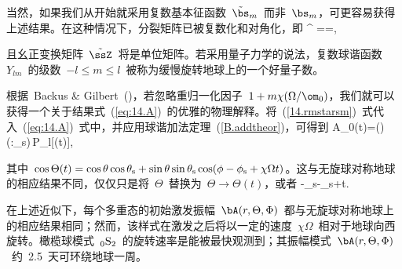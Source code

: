 当然，如果我们从开始就采用复数基本征函数~$\tilde{\bs}_m$~而非~$\bs_m$，可更容易获得上述结果。在这种情况下，分裂矩阵已被复数化和对角化，即
\eq
\tilde{\ssH}^{}
=\tilde{\ssW}=\ssDelta,
\en

且幺正变换矩阵~$\tilde{\ssZ}$~将是单位矩阵。若采用量子力学的说法，复数球谐函数~$Y_{lm}$~的级数~$-l\leq m\leq l$~被称为缓慢旋转地球上的一个好量子数。

根据~Backus \& Gilbert~(\citeyear{backus&gilbert61})，若忽略重归一化因子~$1+m\chi(\Omega/\om_0)$，我们就可以获得一个关于结果式~(\ref{eq:14.A})~的优雅的物理解释。将~(\ref{14.rmstarsm})~式代入~(\ref{eq:14.A})~式中，并应用球谐加法定理~(\ref{B.addtheor})，可得到
\eq
A_0(t)=(\bnuh\cdot\bD)(\bM\!:\!\bE_{\rm s})\,P_l[\cos\Theta(t)],
\en

其中~$\cos\Theta(t)=\cos\theta\cos\theta_{\rm s}
+\sin\theta\sin\theta_{\rm s}\cos(\phi-\phi_{\rm s}+\chi\Omega t)$。这与无旋球对称地球的相应结果不同，仅仅只是将~$\Theta$~替换为~$\Theta\rightarrow\Theta(t)$，或者
\eq
\phi-\phi_{\rm s}\rightarrow\phi-\phi_{\rm s}+\chi\Omega t.
\en

在上述近似下，每个多重态的初始激发振幅~$\bA(r,\Theta,\Phi)$~都与无旋球对称地球上的相应结果相同；然而，该样式在激发之后将以一定的速度~$\chi\Omega$~相对于地球向西旋转。橄榄球模式~${}_0{\rm S}_2$~的旋转速率是能被最快观测到；其振幅模式~$\bA(r,\Theta,\Phi)$~约~2.5~天可环绕地球一周。
%
%

